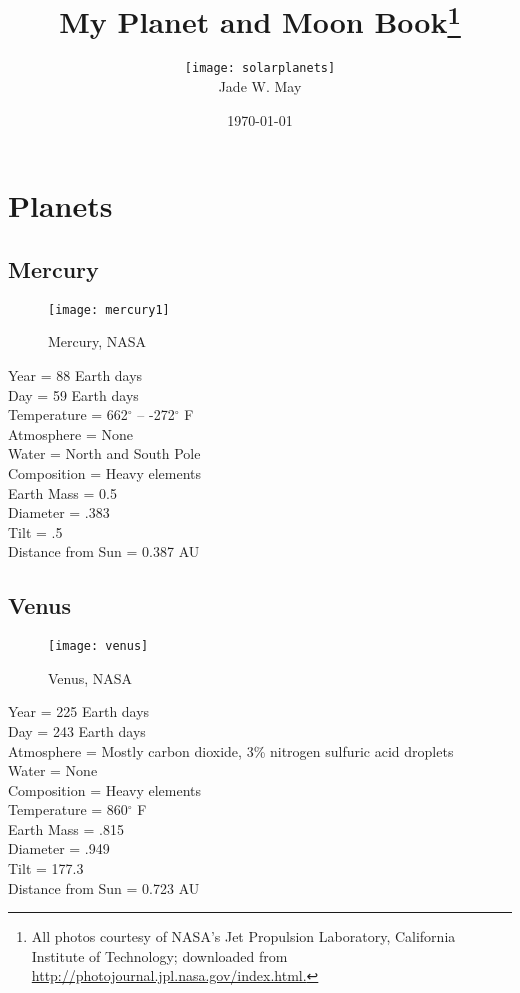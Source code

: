 \documentclass[12pt]{book}
\begin{document}
\frontmatter 
\title{\Huge My Planet and Moon Book\footnote{All photos courtesy of NASA's Jet Propulsion Laboratory, California Institute of Technology; downloaded from \href{http://photojournal.jpl.nasa.gov/index.html}{http://photojournal.jpl.nasa.gov/index.html.}}}
\author{\texttt{[image: solarplanets]}\\ \LARGE Jade W. May\\ \date{\today}}

\maketitle

\chapter{Planets}
\section{Mercury}
    \begin{wrapfigure}{R}{0.3\textwidth}
        \texttt{[image: mercury1]}\caption{\scriptsize Mercury, NASA}
    \end{wrapfigure}
Year = 88 Earth days\\
Day = 59 Earth days\\
Temperature = 662$^{\circ}$ -- -272$^{\circ}$ F\\
Atmosphere = None\\
Water = North and South Pole\\
Composition = Heavy elements\\
Earth Mass = 0.5\\
Diameter = .383\\ 
Tilt = .5\\
Distance from Sun = 0.387 AU\\
\section{Venus}  
 \begin{wrapfigure}{R}{0.3\textwidth}
         \vspace{-1cm}
        \begin{center}
        \texttt{[image: venus]}\caption{\scriptsize Venus, NASA}
        \end{center}
         \vspace{-1cm}
    \end{wrapfigure}
Year = 225 Earth days\\
Day = 243 Earth days\\
Atmosphere = Mostly carbon dioxide, 3\% nitrogen sulfuric acid droplets\\
Water = None\\
Composition = Heavy elements\\
Temperature = 860$^{\circ}$ F\\
Earth Mass = .815\\
Diameter = .949\\ 
Tilt = 177.3\\
Distance from Sun = 0.723 AU\\
\end{document}
